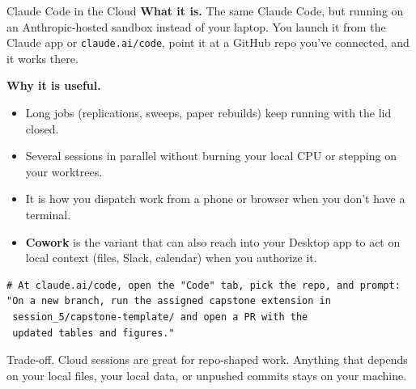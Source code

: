 \documentclass[aspectratio=169, 11pt]{beamer}
\begin{document}
\begin{frame}[fragile]{Claude Code in the Cloud}
  \textbf{What it is.} The same Claude Code, but running on an Anthropic-hosted sandbox instead of your laptop. You launch it from the Claude app or \texttt{claude.ai/code}, point it at a GitHub repo you've connected, and it works there.

  \vspace{0.4em}
  \textbf{Why it is useful.}
  \begin{itemize}\small
    \item Long jobs (replications, sweeps, paper rebuilds) keep running with the lid closed.
    \item Several sessions in parallel without burning your local CPU or stepping on your worktrees.
    \item It is how you dispatch work from a phone or browser when you don't have a terminal.
    \item \textbf{Cowork} is the variant that can also reach into your Desktop app to act on local context (files, Slack, calendar) when you authorize it.
  \end{itemize}

  \vspace{0.3em}
  \begin{lstlisting}[basicstyle=\ttfamily\footnotesize]
# At claude.ai/code, open the "Code" tab, pick the repo, and prompt:
"On a new branch, run the assigned capstone extension in
 session_5/capstone-template/ and open a PR with the
 updated tables and figures."
  \end{lstlisting}

  \vspace{0.2em}
  {\small \alert{Trade-off.} Cloud sessions are great for repo-shaped work. Anything that depends on your local files, your local data, or unpushed commits stays on your machine.}
\end{frame}

\end{document}
